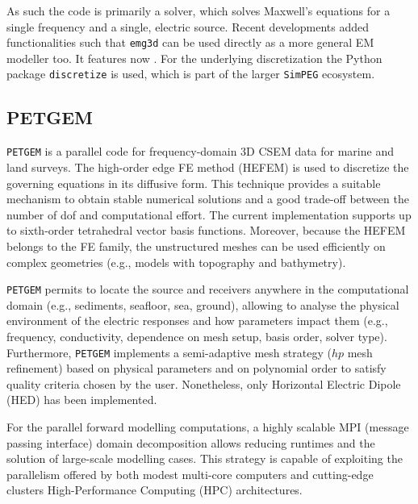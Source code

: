 \documentclass[extra, camera,%
]{gji}
\newcommand{\emg}[2]{\texttt{emg#1#2}\xspace}
\newcommand{\simpeg}{\texttt{SimPEG}\xspace}
\newcommand{\discretize}{\texttt{discretize}\xspace}
\newcommand{\petgem}{\texttt{PETGEM}\xspace}
\begin{document}
As such the code is primarily a solver, which solves Maxwell's equations for a single frequency and a single, electric source. Recent developments added functionalities such that \emg3d can be used directly as a more general EM modeller too. It features now . For the underlying discretization the Python package \discretize is used, which is part of the larger \simpeg ecosystem.

\subsection{PETGEM}

\petgem is a parallel code for frequency-domain 3D CSEM data for marine and land surveys. The high-order edge FE method (HEFEM) is used to discretize the governing equations in its diffusive form. This technique provides a suitable mechanism to obtain stable numerical solutions and a good trade-off between the number of dof and computational effort. The current implementation supports up to sixth-order tetrahedral vector basis functions. Moreover, because the HEFEM belongs to the FE family, the unstructured meshes can be used efficiently on complex geometries (e.g., models with topography and bathymetry).

\petgem permits to locate the source and receivers anywhere in the computational domain (e.g., sediments, seafloor, sea, ground), allowing to analyse the physical environment of the electric responses and how parameters impact them (e.g., frequency, conductivity, dependence on mesh setup, basis order, solver type). Furthermore, \petgem implements a semi-adaptive mesh strategy ($hp$ mesh refinement) based on physical parameters and on polynomial order to satisfy quality criteria chosen by the user. Nonetheless, only Horizontal Electric Dipole (HED) has been implemented.

For the parallel forward modelling computations, a highly scalable MPI (message passing interface) domain decomposition allows reducing runtimes and the solution of large-scale modelling cases. This strategy is capable of exploiting the parallelism offered by both modest multi-core computers and cutting-edge clusters  High-Performance Computing (HPC) architectures\deleted{)}.
\end{document}
